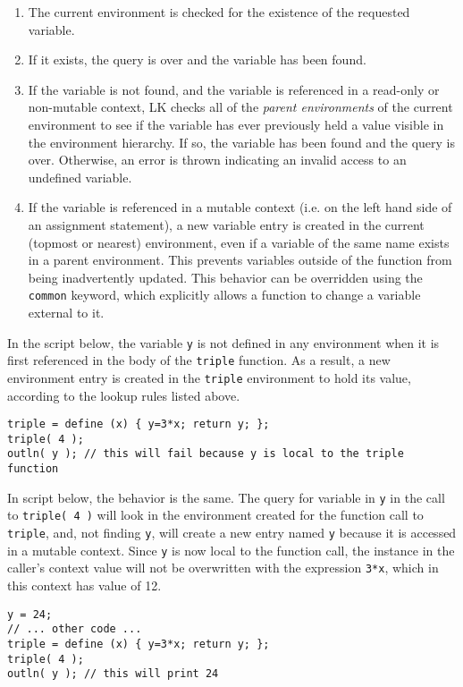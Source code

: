 \documentclass{article}
\begin{document}
\begin{enumerate}
\item The current environment is checked for the existence of the requested variable.
\item If it exists, the query is over and the variable has been found.
\item If the variable is not found, and the variable is referenced in a read-only or non-mutable context, LK checks all of the \emph{parent environments} of the current environment to see if the variable has ever previously held a value visible in the environment hierarchy.  If so, the variable has been found and the query is over. Otherwise, an error is thrown indicating an invalid access to an undefined variable.
\item If the variable is referenced in a mutable context (i.e. on the left hand side of an assignment statement), a new variable entry is created in the current (topmost or nearest) environment, even if a variable of the same name exists in a parent environment.  This prevents variables outside of the function from being inadvertently updated.  This behavior can be overridden using the \texttt{common} keyword, which explicitly allows a function to change a variable external to it.
\end{enumerate}

In the script below, the variable \texttt{y} is not defined in any environment when it is first referenced in the body of the \texttt{triple} function.  As a result, a new environment entry is created in the \texttt{triple} environment to hold its value, according to the lookup rules listed above.

\begin{verbatim}
triple = define (x) { y=3*x; return y; };
triple( 4 );
outln( y ); // this will fail because y is local to the triple function
\end{verbatim}

In script below, the behavior is the same.  The query for variable in \texttt{y} in the call to \texttt{triple( 4 )} will look in the environment created for the function call to \texttt{triple}, and, not finding \texttt{y}, will create a new entry named \texttt{y} because it is accessed in a mutable context.  Since \texttt{y} is now local to the function call, the instance in the caller's context value will not be overwritten with the expression \texttt{3*x}, which in this context has value of 12.

\begin{verbatim}
y = 24;
// ... other code ...
triple = define (x) { y=3*x; return y; };
triple( 4 );
outln( y ); // this will print 24
\end{verbatim}
\end{document}
